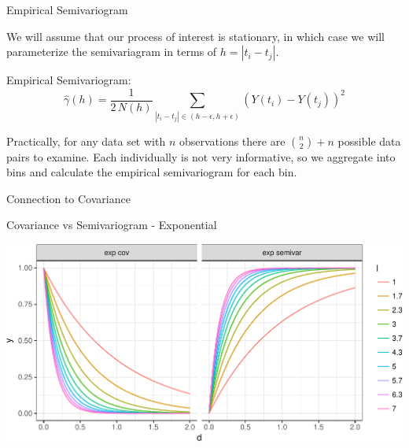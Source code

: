 \documentclass[11pt,ignorenonframetext,]{beamer}
\begin{document}
\begin{frame}[t]{%
\protect\hypertarget{empirical-semivariogram}{%
Empirical Semivariogram}}

We will assume that our process of interest is stationary, in which case
we will parameterize the semivariagram in terms of \(h = |t_i - t_j|\).

\vspace{3mm}

Empirical Semivariogram:
\[ \hat{\gamma}(h) = \frac{1}{2 \, N(h)} \sum_{|t_i-t_j| \in (h-\epsilon,h+\epsilon)} (Y(t_i) - Y(t_j))^2 \]

\pause

Practically, for any data set with \(n\) observations there are
\({n \choose 2} + n\) possible data pairs to examine. Each individually
is not very informative, so we aggregate into bins and calculate the
empirical semivariogram for each bin.

\end{frame}

\begin{frame}{%
\protect\hypertarget{connection-to-covariance}{%
Connection to Covariance}}

\end{frame}

\begin{frame}{%
\protect\hypertarget{covariance-vs-semivariogram---exponential}{%
Covariance vs Semivariogram - Exponential}}

\begin{center}\includegraphics[width=\textwidth]{Lec13_files/figure-beamer/unnamed-chunk-2-1} \end{center}

\end{frame}
\end{document}
